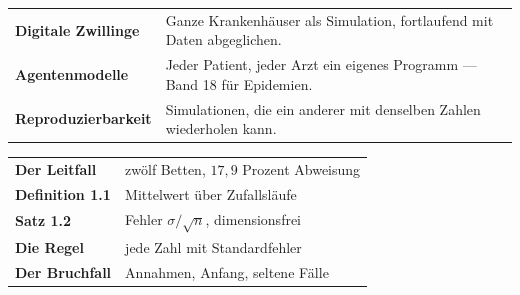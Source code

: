\begin{forschung}
\begin{center}
{\small
\renewcommand{\arraystretch}{1.45}
\begin{tabular}{@{}P{3.0cm}P{5.2cm}@{}}
\toprule
\textbf{Digitale Zwillinge} & Ganze Krankenhäuser als Simulation, fortlaufend mit Daten abgeglichen.\\
\textbf{Agentenmodelle} & Jeder Patient, jeder Arzt ein eigenes Programm --- Band 18 für Epidemien.\\
\textbf{Reproduzier\-barkeit} & Simulationen, die ein anderer mit denselben Zahlen wiederholen kann.\\
\bottomrule
\end{tabular}}
\end{center}

\begin{center}
\begin{minipage}{0.88\textwidth}
\end{minipage}
\end{center}
\end{forschung}

\begin{merksatz}
\begin{center}
\renewcommand{\arraystretch}{1.5}
\begin{tabular}{@{}P{3.0cm}P{5.6cm}@{}}
\toprule
\textbf{Der Leitfall} & zwölf Betten, $17{,}9$ Prozent Abweisung\\
\textbf{Definition 1.1} & Mittelwert über Zufallsläufe\\
\textbf{Satz 1.2} & Fehler $\sigma/\sqrt n$, dimensionsfrei\\
\textbf{Die Regel} & jede Zahl mit Standardfehler\\
\textbf{Der Bruchfall} & Annahmen, Anfang, seltene Fälle\\
\bottomrule
\end{tabular}
\end{center}

\begin{center}
\begin{minipage}{0.88\textwidth}
\end{minipage}
\end{center}
\end{merksatz}
